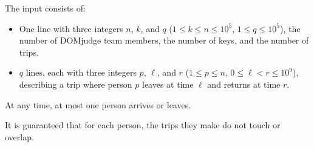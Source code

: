 
    The input consists of:
    \begin{itemize}
		\item One line with three integers $n$, $k$, and $q$ ($1\le k\le n\le 10^5$, $1\le q\le 10^5$),
			the number of DOMjudge team members,
			the number of keys, and the number of trips.
		\item $q$ lines, each with three integers $p$, $\ell$, and $r$ ($1\le p \le n$, $0\leq \ell < r\le 10^9$),
            describing a trip where person $p$ leaves at time $\ell$ and returns at time $r$.
    \end{itemize}
    At any time, at most one person arrives or leaves.

	It is guaranteed that for each person, the trips they make do not touch or overlap.
